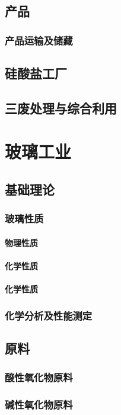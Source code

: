 \documentclass[UTF8]{../../ApplicationUniverse}
\begin{document}
\section{产品}
    \subsection{产品运输及储藏}
\section{硅酸盐工厂}
\section{三废处理与综合利用}




\chapter{玻璃工业}
\section{基础理论}
    \subsection{玻璃性质}
        \subsubsection{物理性质}
        \subsubsection{化学性质}
        \subsubsection{化学性质}
    \subsection{化学分析及性能测定}
\section{原料}
    \subsection{酸性氧化物原料}
    \subsection{碱性氧化物原料}
\end{document}
